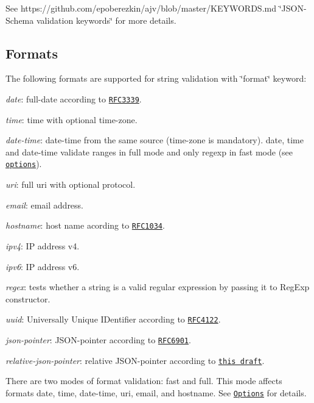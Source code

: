 See https\+://github.com/epoberezkin/ajv/blob/master/\+K\+E\+Y\+W\+O\+R\+D\+S.\+md \char`\"{}\+J\+S\+O\+N-\/\+Schema validation keywords\char`\"{} for more details.

\subsection*{Formats}

The following formats are supported for string validation with \char`\"{}format\char`\"{} keyword\+:


\begin{DoxyItemize}
\item {\itshape date}\+: full-\/date according to \href{http://tools.ietf.org/html/rfc3339#section-5.6}{\tt R\+F\+C3339}.
\item {\itshape time}\+: time with optional time-\/zone.
\item {\itshape date-\/time}\+: date-\/time from the same source (time-\/zone is mandatory). {\ttfamily date}, {\ttfamily time} and {\ttfamily date-\/time} validate ranges in {\ttfamily full} mode and only regexp in {\ttfamily fast} mode (see \href{#options}{\tt options}).
\item {\itshape uri}\+: full uri with optional protocol.
\item {\itshape email}\+: email address.
\item {\itshape hostname}\+: host name acording to \href{http://tools.ietf.org/html/rfc1034#section-3.5}{\tt R\+F\+C1034}.
\item {\itshape ipv4}\+: IP address v4.
\item {\itshape ipv6}\+: IP address v6.
\item {\itshape regex}\+: tests whether a string is a valid regular expression by passing it to Reg\+Exp constructor.
\item {\itshape uuid}\+: Universally Unique I\+Dentifier according to \href{http://tools.ietf.org/html/rfc4122}{\tt R\+F\+C4122}.
\item {\itshape json-\/pointer}\+: J\+S\+O\+N-\/pointer according to \href{https://tools.ietf.org/html/rfc6901}{\tt R\+F\+C6901}.
\item {\itshape relative-\/json-\/pointer}\+: relative J\+S\+O\+N-\/pointer according to \href{http://tools.ietf.org/html/draft-luff-relative-json-pointer-00}{\tt this draft}.
\end{DoxyItemize}

There are two modes of format validation\+: {\ttfamily fast} and {\ttfamily full}. This mode affects formats {\ttfamily date}, {\ttfamily time}, {\ttfamily date-\/time}, {\ttfamily uri}, {\ttfamily email}, and {\ttfamily hostname}. See \href{#options}{\tt Options} for details.

